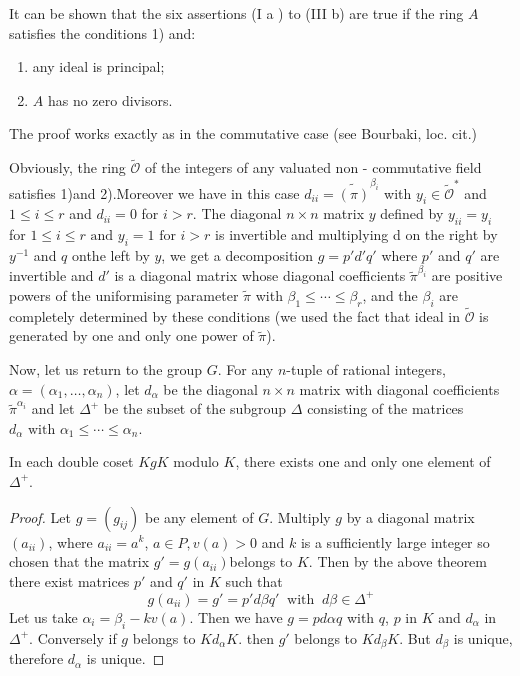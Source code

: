 \begin{remark*}
  It can be shown that the six assertions (I a ) to (III b) are
  true if the ring $A$ satisfies the conditions 1) and:  
  \begin{enumerate}[1)]
  \item any ideal is principal;
  \item $A$ has no zero divisors.
  \end{enumerate}
  The proof works exactly as in the commutative case (see Bourbaki, loc. cit.)
\end{remark*}

Obviously, the ring $\tilde{\mathscr{O}}$ of the integers of any valuated
non - commutative field satisfies 1)and 2).Moreover we have in this case
$d_{ii}= \tilde{(\pi)}^{\beta_i}$ with $y_i \in \tilde{\mathscr{O}}^\ast$  and $1
\leq i \leq r$ and  $d_{ii}=0$ for  $i >r$. The diagonal $n \times n $
matrix $y$ defined by $y_{ii}=y_i$  for  $1 \leq i \leq r \text{ and }
y_i =1 \text{ for } i > r$ is invertible and multiplying d on the
right by $y^{-1}$ and $q$ on\pageoriginale the left by $y$, we get a decomposition
$g=p'd'q'$ where $p'$ and $q'$ are invertible and $d'$ is a diagonal
matrix whose diagonal coefficients $\tilde{\pi}^{\beta_i} $ are positive powers of the
uniformising parameter $\widetilde{\pi}$  with  $\beta_1
\leq \cdots \leq \beta_r$, and the $\beta_i$ are completely determined
by these conditions (we used the fact that ideal in $\tilde{\mathscr{O}}$ is
generated by one and only one power of $\widetilde{\pi}$).  

Now, let us return to the group $G$. For any $n$-tuple of
rational integers, $\alpha= (\alpha_1, \ldots, \alpha_n)$, let
$d_{\alpha}$ be the diagonal $n \times n$ matrix with diagonal coefficients
$\tilde{\pi}^{\alpha_i}$ and let $\Delta^+$ be the subset of the
subgroup $\Delta$ consisting of the matrices $d_{\alpha} \text{ with }
\alpha_1 \leq \cdots \leq \alpha_n$. 

\begin{proposition}\label{part2:chap2:sec2:prop2}
  In each double coset $K g K$ modulo $K$, there exists one and only
    one element of $\Delta^+$. 
\end{proposition}

\begin{proof}
  Let $g = (g_{ij})$ be any element of $G$. Multiply $g$ by a diagonal
  matrix $(a_{ii})$, where $a_{ii}= a^k$, $a \in P, v(a)> 0$ and $k$ is a
  sufficiently large integer so chosen that the matrix $g' =
  g{(a_{ii})}$belongs to $K$. Then by the above theorem there exist
  matrices $p'$ and $q'$ in $K$ such that  
  $$
  g(a_{ii}) = g' =p' d \beta q'  ~\text{ with }~  d \beta \in \Delta^+
  $$
  Let us take $\alpha_i = \beta_i -k v(a)$. Then we have $g = p
  d \alpha q$ with $q$, $p$ in $K$ and $d_{\alpha}$ in
  $\Delta^+$. Conversely if $g$ belongs to $K d_{\alpha} K$. then $g'$
  belongs to $K d_{\beta}K$. But $d_{\beta}$ is unique, therefore
  $d_{\alpha}$ is unique.  
\end{proof}

